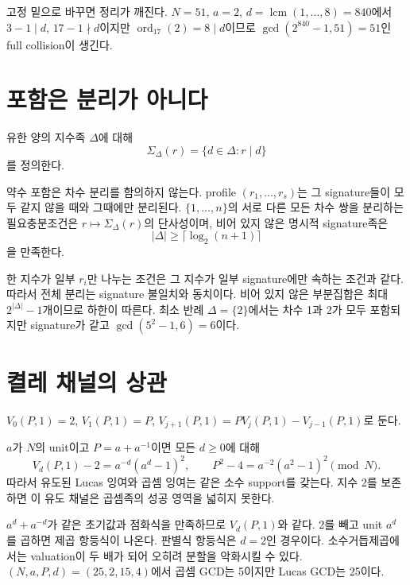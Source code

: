 \documentclass[11pt]{article}
\begin{document}
고정 밑으로 바꾸면 정리가 깨진다. \(N=51\), \(a=2\),
\(d=\operatorname{lcm}(1,\ldots,8)=840\)에서 \(3-1\mid d\),
\(17-1\nmid d\)이지만 \(\operatorname{ord}_{17}(2)=8\mid d\)이므로
\(\gcd(2^{840}-1,51)=51\)인 full collision이 생긴다.

\section{포함은 분리가 아니다}

유한 양의 지수족 \(\Delta\)에 대해
\[
\Sigma_\Delta(r)=\{d\in\Delta:r\mid d\}
\]
를 정의한다.

{}
약수 포함은 차수 분리를 함의하지 않는다.
profile \((r_1,\ldots,r_s)\)는 그 signature들이 모두 같지 않을 때와
그때에만 분리된다. \(\{1,\ldots,n\}\)의 서로 다른 모든 차수 쌍을
분리하는 필요충분조건은 \(r\mapsto\Sigma_\Delta(r)\)의 단사성이며,
비어 있지 않은 명시적 signature족은
\[
|\Delta|\ge\lceil\log_2(n+1)\rceil
\]
을 만족한다.

\begin{claimproof}
한 지수가 일부 \(r_i\)만 나누는 조건은 그 지수가 일부 signature에만
속하는 조건과 같다. 따라서 전체 분리는 signature 불일치와 동치이다.
비어 있지 않은 부분집합은 최대 \(2^{|\Delta|}-1\)개이므로 하한이
따른다. 최소 반례 \(\Delta=\{2\}\)에서는 차수 1과 2가 모두 포함되지만
signature가 같고 \(\gcd(5^2-1,6)=6\)이다.
\end{claimproof}

\section{켤레 채널의 상관}

\(V_0(P,1)=2\), \(V_1(P,1)=P\),
\(V_{j+1}(P,1)=PV_j(P,1)-V_{j-1}(P,1)\)로 둔다.

{}
\(a\)가 \(N\)의 unit이고
\(P=a+a^{-1}\)이면 모든 \(d\ge0\)에 대해
\[
V_d(P,1)-2=a^{-d}(a^d-1)^2,\qquad
P^2-4=a^{-2}(a^2-1)^2\pmod N.
\]
따라서 유도된 Lucas 잉여와 곱셈 잉여는 같은 소수 support를 갖는다.
지수 2를 보존하면 이 유도 채널은 곱셈족의 성공 영역을 넓히지 못한다.

\begin{claimproof}
\(a^d+a^{-d}\)가 같은 초기값과 점화식을 만족하므로
\(V_d(P,1)\)와 같다. 2를 빼고 unit \(a^d\)를 곱하면 제곱 항등식이
나온다. 판별식 항등식은 \(d=2\)인 경우이다. 소수거듭제곱에서는
valuation이 두 배가 되어 오히려 분할을 악화시킬 수 있다.
\((N,a,P,d)=(25,2,15,4)\)에서 곱셈 GCD는 5이지만 Lucas GCD는 25이다.
\end{claimproof}
\end{document}
